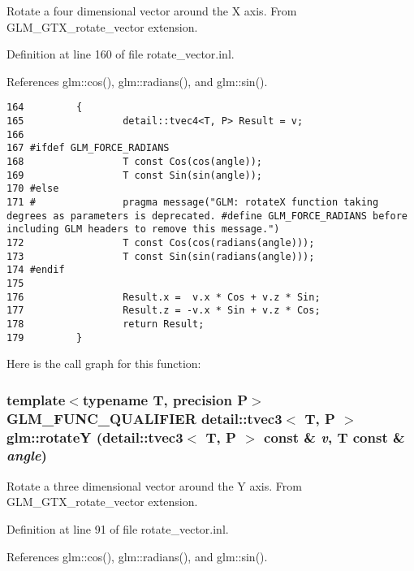 Rotate a four dimensional vector around the X axis. From GLM\_\-GTX\_\-rotate\_\-vector extension. 

Definition at line 160 of file rotate\_\-vector.inl.

References glm::cos(), glm::radians(), and glm::sin().

\begin{Code}\begin{verbatim}164         {
165                 detail::tvec4<T, P> Result = v;
166 
167 #ifdef GLM_FORCE_RADIANS
168                 T const Cos(cos(angle));
169                 T const Sin(sin(angle));
170 #else
171 #               pragma message("GLM: rotateX function taking degrees as parameters is deprecated. #define GLM_FORCE_RADIANS before including GLM headers to remove this message.")
172                 T const Cos(cos(radians(angle)));
173                 T const Sin(sin(radians(angle)));
174 #endif
175 
176                 Result.x =  v.x * Cos + v.z * Sin;
177                 Result.z = -v.x * Sin + v.z * Cos;
178                 return Result;
179         }
\end{verbatim}
\end{Code}




Here is the call graph for this function:\hypertarget{group__gtx__rotate__vector_g8e792cb7fbd2ad57a4eafcccc62c523c}{
\subsubsection[rotateY]{\setlength{\rightskip}{0pt plus 5cm}template$<$typename T, precision P$>$ GLM\_\-FUNC\_\-QUALIFIER detail::tvec3$<$ T, P $>$ glm::rotateY (detail::tvec3$<$ T, P $>$ const \& {\em v}, \/  T const \& {\em angle})}}
\label{group__gtx__rotate__vector_g8e792cb7fbd2ad57a4eafcccc62c523c}


Rotate a three dimensional vector around the Y axis. From GLM\_\-GTX\_\-rotate\_\-vector extension. 

Definition at line 91 of file rotate\_\-vector.inl.

References glm::cos(), glm::radians(), and glm::sin().


